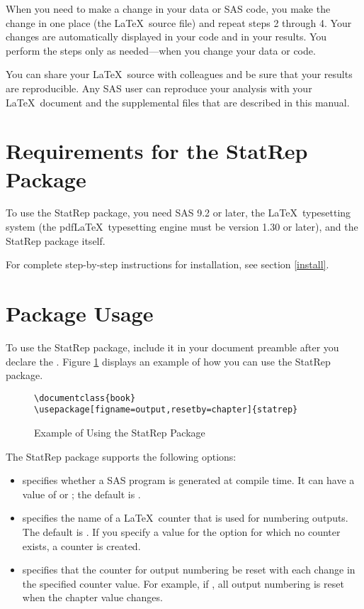 \documentclass[article,oneside]{memoir}
\newcommand*{\StatRep}{\textsf{StatRep}\xspace}
\begin{document}
When you need to make a change in your data or SAS code, you make the change in
one place (the \LaTeX\ source file) and repeat steps 2 through 4.
Your changes are automatically displayed in your code and in your results.
You perform the steps only as needed---when you change your data or code.

You can share your \LaTeX\ source with colleagues and be sure that your results
are reproducible. Any SAS user can reproduce your analysis with your \LaTeX\ document
and the supplemental files that are described in this manual.

\section{Requirements for the \StatRep Package}
To use the \StatRep package, you need SAS 9.2 or later,
the \LaTeX\ typesetting system
(the  pdf\LaTeX\ typesetting engine must be version 1.30 or later), and the \StatRep package itself.

For complete step-by-step instructions for installation, see section \ref{install}.
\section{Package Usage}
  To use the \StatRep package, include it in your document preamble after you
  declare the .
  Figure \ref{fig:usage} displays an example of how you can use the \StatRep package.

\begin{figure}[H]
\begin{shaded}
\begin{verbatim}
\documentclass{book}
\usepackage[figname=output,resetby=chapter]{statrep}
\end{verbatim}%
\end{shaded}
\caption{Example of Using the \StatRep Package}\label{fig:usage}
\end{figure}

 The \StatRep package supports the following options:
     \begin{itemize}
     \item {} specifies whether a SAS program
     is generated at compile time. 
     It can have a value of  or ; the default is .

     \item {} specifies the name of a \LaTeX\ counter
     that is used for numbering outputs.
     The default is . If you specify a value for the 
     option for which no counter exists,
     a counter is created.

     \item {} specifies that the counter for output numbering be reset with
     each change in the specified counter value. For example, if ,
     all output numbering is reset when the chapter value changes.
     \end{itemize}
\end{document}
